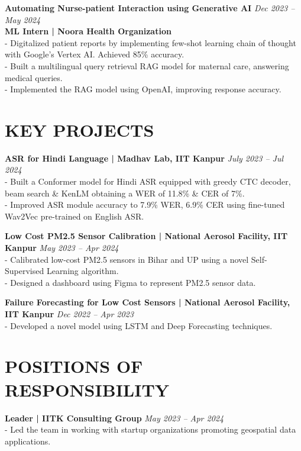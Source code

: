 \documentclass[a4paper,10pt]{article}
\begin{document}
\noindent
\textbf{Automating Nurse-patient Interaction using Generative AI} \hfill \textit{Dec 2023 -- May 2024} \\
\textbf{ML Intern | Noora Health Organization} \\
- Digitalized patient reports by implementing few-shot learning chain of thought with Google’s Vertex AI. Achieved 85\% accuracy. \\
- Built a multilingual query retrieval RAG model for maternal care, answering medical queries. \\
- Implemented the RAG model using OpenAI, improving response accuracy.

\section*{KEY PROJECTS}
\noindent
\textbf{ASR for Hindi Language | Madhav Lab, IIT Kanpur} \hfill \textit{July 2023 -- Jul 2024} \\
- Built a Conformer model for Hindi ASR equipped with greedy CTC decoder, beam search \& KenLM obtaining a WER of 11.8\% \& CER of 7\%. \\
- Improved ASR module accuracy to 7.9\% WER, 6.9\% CER using fine-tuned Wav2Vec pre-trained on English ASR. \\
\vspace{2mm}

\noindent
\textbf{Low Cost PM2.5 Sensor Calibration | National Aerosol Facility, IIT Kanpur} \hfill \textit{May 2023 -- Apr 2024} \\
- Calibrated low-cost PM2.5 sensors in Bihar and UP using a novel Self-Supervised Learning algorithm. \\
- Designed a dashboard using Figma to represent PM2.5 sensor data. \\
\vspace{2mm}

\noindent
\textbf{Failure Forecasting for Low Cost Sensors | National Aerosol Facility, IIT Kanpur} \hfill \textit{Dec 2022 -- Apr 2023} \\
- Developed a novel model using LSTM and Deep Forecasting techniques.

\section*{POSITIONS OF RESPONSIBILITY}
\noindent
\textbf{Leader | IITK Consulting Group} \hfill \textit{May 2023 -- Apr 2024} \\
- Led the team in working with startup organizations promoting geospatial data applications. \\
\vspace{2mm}

\end{document}
